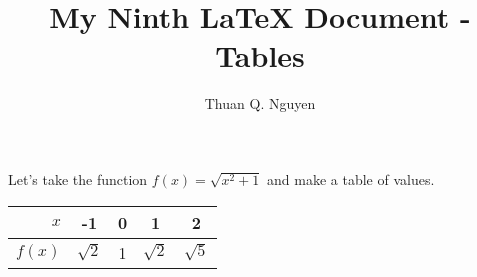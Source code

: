 \documentclass{article}
\begin{document}
\title{My Ninth \LaTeX{} Document - Tables}
\author{Thuan Q. Nguyen}
\maketitle


Let's take the function $f(x) = \sqrt{x^2+1}$ and make a table of values.

\begin{center}
\begin{tabular}{r|cccc}
$x$       &  -1 & 0 & 1 & 2 \\
\hline
$f(x)$    & $\sqrt{2}$ & 1 & $\sqrt{2}$ & $\sqrt{5}$
\end{tabular}
\end{center}
\end{document}
